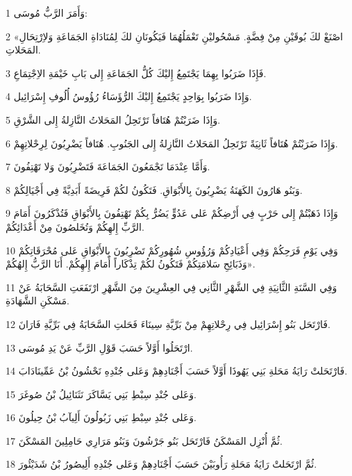 \par 1 وَأَمَرَ الرَّبُّ مُوسَى:
\par 2 «اصْنَعْ لكَ بُوقَيْنِ مِنْ فِضَّةٍ. مَسْحُوليْنِ تَعْمَلُهُمَا فَيَكُونَانِ لكَ لِمُنَادَاةِ الجَمَاعَةِ وَلاِرْتِحَالِ المَحَلاتِ.
\par 3 فَإِذَا ضَرَبُوا بِهِمَا يَجْتَمِعُ إِليْكَ كُلُّ الجَمَاعَةِ إِلى بَابِ خَيْمَةِ الاِجْتِمَاعِ.
\par 4 وَإِذَا ضَرَبُوا بِوَاحِدٍ يَجْتَمِعُ إِليْكَ الرُّؤَسَاءُ رُؤُوسُ أُلُوفِ إِسْرَائِيل.
\par 5 وَإِذَا ضَرَبْتُمْ هُتَافاً تَرْتَحِلُ المَحَلاتُ النَّازِلةُ إِلى الشَّرْقِ.
\par 6 وَإِذَا ضَرَبْتُمْ هُتَافاً ثَانِيَةً تَرْتَحِلُ المَحَلاتُ النَّازِلةُ إِلى الجَنُوبِ. هُتَافاً يَضْرِبُونَ لِرِحْلاتِهِمْ.
\par 7 وَأَمَّا عِنْدَمَا تَجْمَعُونَ الجَمَاعَةَ فَتَضْرِبُونَ وَلا تَهْتِفُونَ.
\par 8 وَبَنُو هَارُونَ الكَهَنَةُ يَضْرِبُونَ بِالأَبْوَاقِ. فَتَكُونُ لكُمْ فَرِيضَةً أَبَدِيَّةً فِي أَجْيَالِكُمْ.
\par 9 وَإِذَا ذَهَبْتُمْ إِلى حَرْبٍ فِي أَرْضِكُمْ عَلى عَدُوٍّ يَضُرُّ بِكُمْ تَهْتِفُونَ بِالأَبْوَاقِ فَتُذْكَرُونَ أَمَامَ الرَّبِّ إِلهِكُمْ وَتُخَلصُونَ مِنْ أَعْدَائِكُمْ.
\par 10 وَفِي يَوْمِ فَرَحِكُمْ وَفِي أَعْيَادِكُمْ وَرُؤُوسِ شُهُورِكُمْ تَضْرِبُونَ بِالأَبْوَاقِ عَلى مُحْرَقَاتِكُمْ وَذَبَائِحِ سَلامَتِكُمْ فَتَكُونُ لكُمْ تِذْكَاراً أَمَامَ إِلهِكُمْ. أَنَا الرَّبُّ إِلهُكُمْ».
\par 11 وَفِي السَّنَةِ الثَّانِيَةِ فِي الشَّهْرِ الثَّانِي فِي العِشْرِينَ مِنَ الشَّهْرِ ارْتَفَعَتِ السَّحَابَةُ عَنْ مَسْكَنِ الشَّهَادَةِ.
\par 12 فَارْتَحَل بَنُو إِسْرَائِيل فِي رِحْلاتِهِمْ مِنْ بَرِّيَّةِ سِينَاءَ فَحَلتِ السَّحَابَةُ فِي بَرِّيَّةِ فَارَانَ.
\par 13 ارْتَحَلُوا أَوَّلاً حَسَبَ قَوْلِ الرَّبِّ عَنْ يَدِ مُوسَى.
\par 14 فَارْتَحَلتْ رَايَةُ مَحَلةِ بَنِي يَهُوذَا أَوَّلاً حَسَبَ أَجْنَادِهِمْ وَعَلى جُنْدِهِ نَحْشُونُ بْنُ عَمِّينَادَابَ.
\par 15 وَعَلى جُنْدِ سِبْطِ بَنِي يَسَّاكَرَ نَثَنَائِيلُ بْنُ صُوغَرَ.
\par 16 وَعَلى جُنْدِ سِبْطِ بَنِي زَبُولُونَ أَلِيآبُ بْنُ حِيلُونَ.
\par 17 ثُمَّ أُنْزِل المَسْكَنُ فَارْتَحَل بَنُو جَرْشُونَ وَبَنُو مَرَارِي حَامِلِينَ المَسْكَنَ.
\par 18 ثُمَّ ارْتَحَلتْ رَايَةُ مَحَلةِ رَأُوبَيْنَ حَسَبَ أَجْنَادِهِمْ وَعَلى جُنْدِهِ أَلِيصُورُ بْنُ شَدَيْئُورَ.
